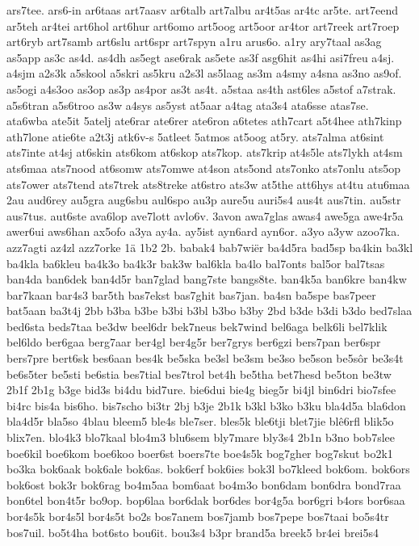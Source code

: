 ars7tee.
ars6-in
ar6taas
art7aasv
ar6talb
art7albu
ar4t5as
ar4tc
ar5te.
art7eend
ar5teh
ar4tei
art6hol
art6hur
art6omo
art5oog
art5oor
ar4tor
art7reek
art7roep
art6ryb
art7samb
art6slu
art6spr
art7spyn
a1ru
arus6o.
a1ry
ary7taal
as3ag
as5app
as3c
as4d.
as4dh
as5egt
ase6rak
as5ete
as3f
asg6hit
as4hi
asi7freu
a4sj.
a4sjm
a2s3k
a5skool
a5skri
as5kru
a2s3l
as5laag
as3m
a4smy
a4sna
as3no
as9of.
as5ogi
a4s3oo
as3op
as3p
as4por
as3t
as4t.
a5staa
as4th
ast6les
a5stof
a7strak.
a5s6tran
a5s6troo
as3w
a4sys
as5yst
at5aar
a4tag
ata3s4
ata6sse
atas7se.
ata6wba
ate5it
5atelj
ate6rar
ate6rer
ate6ron
a6tetes
ath7cart
a5t4hee
ath7kinp
ath7lone
atie6te
a2t3j
atk6v-s
5atleet
5atmos
at5oog
at5ry.
ats7alma
at6sint
ats7inte
at4sj
at6skin
ats6kom
at6skop
ats7kop.
ats7krip
at4s5le
ats7lykh
at4sm
ats6maa
ats7nood
at6somw
ats7omwe
at4son
ats5ond
ats7onko
ats7onlu
ats5op
ats7ower
ats7tend
ats7trek
ats8treke
at6stro
ats3w
at5the
att6hys
at4tu
atu6maa
2au
aud6rey
au5gra
aug6sbu
aul6spo
au3p
aure5u
auri5s4
aus4t
aus7tin.
au5str
aus7tus.
aut6ste
ava6lop
ave7lott
avlo6v.
3avon
awa7glas
awas4
awe5ga
awe4r5a
awer6ui
aws6han
ax5ofo
a3ya
ay4a.
ay5ist
ayn6ard
ayn6or.
a3yo
a3yw
azoo7ka.
azz7agti
az4zl
azz7orke
1ä
1b2
2b.
babak4
bab7wiër
ba4d5ra
bad5sp
ba4kin
ba3kl
ba4kla
ba6kleu
ba4k3o
ba4k3r
bak3w
bal6kla
ba4lo
bal7onts
bal5or
bal7tsas
ban4da
ban6dek
ban4d5r
ban7glad
bang7ste
bangs8te.
ban4k5a
ban6kre
ban4kw
bar7kaan
bar4s3
bar5th
bas7ekst
bas7ghit
bas7jan.
ba4sn
ba5spe
bas7peer
bat5aan
ba3t4j
2bb
b3ba
b3be
b3bi
b3bl
b3bo
b3by
2bd
b3de
b3di
b3do
bed7slaa
bed6sta
beds7taa
be3dw
beel6dr
bek7neus
bek7wind
bel6aga
belk6li
bel7klik
bel6ldo
ber6gaa
berg7aar
ber4gl
ber4g5r
ber7grys
ber6gzi
bers7pan
ber6spr
bers7pre
bert6sk
bes6aan
bes4k
be5ska
be3sl
be3sm
be3so
be5son
be5sôr
be3s4t
be6s5ter
be5sti
be6stia
bes7tial
bes7trol
bet4h
be5tha
bet7hesd
be5ton
be3tw
2b1f
2b1g
b3ge
bid3s
bi4du
bid7ure.
bie6dui
bie4g
bieg5r
bi4jl
bin6dri
bio7sfee
bi4rc
bis4a
bis6ho.
bis7scho
bi3tr
2bj
b3je
2b1k
b3kl
b3ko
b3ku
bla4d5a
bla6don
bla4d5r
bla5so
4blau
bleem5
ble4s
ble7ser.
bles5k
ble6tji
blet7jie
blê6rfl
blik5o
blix7en.
blo4k3
blo7kaal
blo4m3
blu6sem
bly7mare
bly3s4
2b1n
b3no
bob7slee
boe6kil
boe6kom
boe6koo
boer6st
boers7te
boe4s5k
bog7gher
bog7skut
bo2k1
bo3ka
bok6aak
bok6ale
bok6as.
bok6erf
bok6ies
bok3l
bo7kleed
bok6om.
bok6ors
bok6ost
bok3r
bok6rag
bo4m5aa
bom6aat
bo4m3o
bon6dam
bon6dra
bond7raa
bon6tel
bon4t5r
bo9op.
bop6laa
bor6dak
bor6des
bor4g5a
bor6gri
b4ors
bor6saa
bor4s5k
bor4s5l
bor4s5t
bo2s
bos7anem
bos7jamb
bos7pepe
bos7taai
bo5s4tr
bos7uil.
bo5t4ha
bot6sto
bou6it.
bou3s4
b3pr
brand5a
breek5
br4ei
brei5s4
